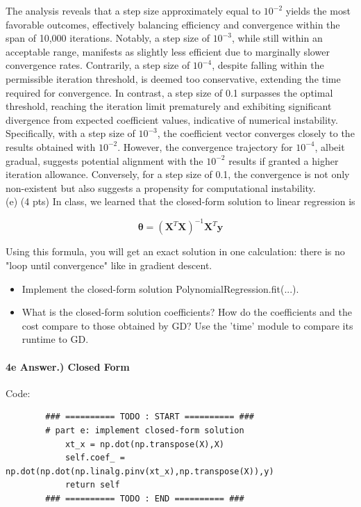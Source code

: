 \documentclass[10pt]{article}
\begin{document}
The analysis reveals that a step size approximately equal to $10^{-2}$ yields the most favorable outcomes, effectively balancing efficiency and convergence within the span of 10,000 iterations. Notably, a step size of $10^{-3}$, while still within an acceptable range, manifests as slightly less efficient due to marginally slower convergence rates. Contrarily, a step size of $10^{-4}$, despite falling within the permissible iteration threshold, is deemed too conservative, extending the time required for convergence. In contrast, a step size of 0.1 surpasses the optimal threshold, reaching the iteration limit prematurely and exhibiting significant divergence from expected coefficient values, indicative of numerical instability. Specifically, with a step size of $10^{-3}$, the coefficient vector converges closely to the results obtained with $10^{-2}$. However, the convergence trajectory for $10^{-4}$, albeit gradual, suggests potential alignment with the $10^{-2}$ results if granted a higher iteration allowance. Conversely, for a step size of 0.1, the convergence is not only non-existent but also suggests a propensity for computational instability.\\

(e) (4 pts) In class, we learned that the closed-form solution to linear regression is

$$
\boldsymbol{\theta}=\left(\boldsymbol{X}^{T} \boldsymbol{X}\right)^{-1} \boldsymbol{X}^{T} \boldsymbol{y}
$$

Using this formula, you will get an exact solution in one calculation: there is no "loop until convergence" like in gradient descent.

\begin{itemize}
  \item Implement the closed-form solution PolynomialRegression.fit(...).
  \item What is the closed-form solution coefficients? How do the coefficients and the cost compare to those obtained by GD? Use the 'time' module to compare its runtime to GD.
\end{itemize}

\paragraph{4e Answer.) Closed Form}
\hspace{1cm}

Code:\\
\begin{verbatim}
        ### ========== TODO : START ========== ###
        # part e: implement closed-form solution
            xt_x = np.dot(np.transpose(X),X)
            self.coef_ = np.dot(np.dot(np.linalg.pinv(xt_x),np.transpose(X)),y)
            return self
        ### ========== TODO : END ========== ###
\end{verbatim}
\end{document}
